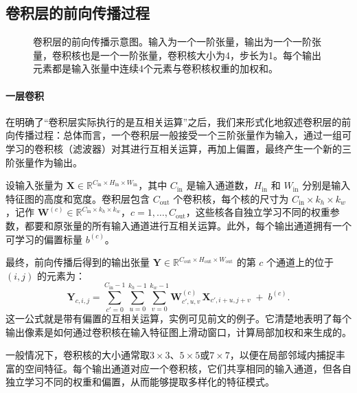 \subsection{卷积层的前向传播过程}

\begin{figure}
    \centering
    
    \caption{卷积层的前向传播示意图。输入为一个一阶张量，输出为一个一阶张量，卷积核也是一个一阶张量，卷积核大小为4，步长为1。每个输出元素都是输入张量中连续4个元素与卷积核权重的加权和。}
    \label{fig:conv_forward}
\end{figure}

\paragraph{一层卷积}

在明确了“卷积层实际执行的是互相关运算”之后，我们来形式化地叙述卷积层的前向传播过程：总体而言，一个卷积层一般接受一个三阶张量作为输入，通过一组可学习的卷积核（滤波器）对其进行互相关运算，再加上偏置，最终产生一个新的三阶张量作为输出。

设输入张量为 $\mathbf{X} \in \mathbb{R}^{C_{\text{in}} \times H_{\text{in}} \times W_{\text{in}}}$，其中 $C_{\text{in}}$ 是输入通道数，$H_{\text{in}}$ 和 $W_{\text{in}}$ 分别是输入特征图的高度和宽度。卷积层包含 $C_{\text{out}}$ 个卷积核，每个核的尺寸为 $C_{\text{in}} \times k_h \times k_w$，记作 $\mathbf{W}^{(c)} \in \mathbb{R}^{C_{\text{in}} \times k_h \times k_w}$，$c = 1,\dots,C_{\text{out}}$，这些核各自独立学习不同的权重参数，都要和原张量的所有输入通道进行互相关运算。此外，每个输出通道拥有一个可学习的偏置标量 $b^{(c)}$。

最终，前向传播后得到的输出张量 $\mathbf{Y} \in \mathbb{R}^{C_{\text{out}} \times H_{\text{out}} \times W_{\text{out}}}$ 的第 $c$ 个通道上的位于 $(i,j)$ 的元素为：
\begin{equation}\label{eq:conv_forward}
    \mathbf{Y}_{c,i,j} = \sum_{c'=0}^{C_{\text{in}}-1} \sum_{u=0}^{k_h-1} \sum_{v=0}^{k_w-1} \mathbf{W}^{(c)}_{c',u,v} \, \mathbf{X}_{c', i+u, j+v} \;+\; b^{(c)}.
\end{equation}
这一公式就是带有偏置的互相关运算，实例可见前文的例子。它清楚地表明了每个输出像素是如何通过卷积核在输入特征图上滑动窗口，计算局部加权和来生成的。

一般情况下，卷积核的大小通常取$3\times3$、$5\times5$或$7\times7$，以便在局部邻域内捕捉丰富的空间特征。每个输出通道对应一个卷积核，它们共享相同的输入通道，但各自独立学习不同的权重和偏置，从而能够提取多样化的特征模式。

